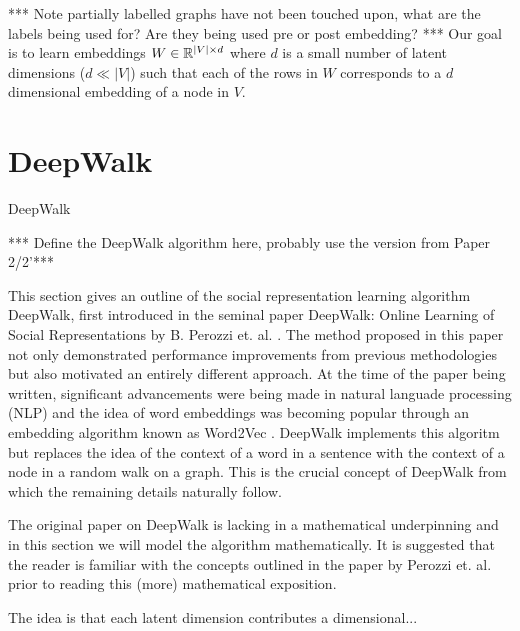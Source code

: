 \documentclass[a4paper]{article}
\begin{document}
*** Note partially labelled graphs have not been touched upon, what are the
labels being used for? Are they being used pre or post embedding? ***
Our goal is to learn embeddings $W \in \R^{|V| \times d}$ where $d$ is a small number
of latent dimensions ($d \ll |V|$) such that each of the rows in $W$
corresponds to a $d$ dimensional embedding of a node in $V$.


\section{DeepWalk}

\begin{algorithm}
  \caption{DeepWalk}
  \begin{algorithmic}[1]

    \EndProcedure

  \end{algorithmic}
\end{algorithm}

*** Define the DeepWalk algorithm here, probably use the version from Paper 2/2'***

This section gives an outline of the social representation learning algorithm
DeepWalk, first introduced in the seminal paper DeepWalk: Online Learning of Social
Representations by B. Perozzi et. al. \cite{deepwalk}. The method proposed in
this paper not only demonstrated performance improvements from previous methodologies but
also motivated an entirely different approach. At the time of the paper being
written, significant advancements were being made in natural languade processing (NLP)
and the idea of word embeddings was becoming popular through an embedding
algorithm known as Word2Vec \cite{mikolov2013efficient,mikolov2013distributed}.
DeepWalk implements this algoritm but replaces the idea of the context of a word in
a sentence with the context of a node in a random walk on a graph. This is the
crucial concept of DeepWalk from which the remaining details naturally follow.

The original paper on DeepWalk is lacking in a mathematical underpinning and in
this section we will model the algorithm mathematically. It is suggested that the reader
is familiar with the concepts outlined in the paper by Perozzi et. al. prior to
reading this (more) mathematical exposition.


The idea is that each latent dimension contributes a 
dimensional...
\end{document}
